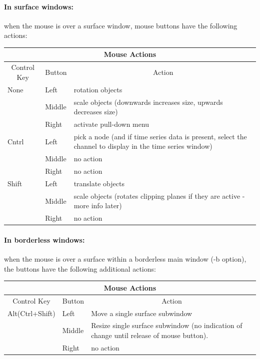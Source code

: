 \paragraph{In surface windows: } when the mouse is over a surface window,
mouse buttons have the following actions:
\begin{center}
  \begin{tabular}{|l|l|p{3in}|} \hline
    \multicolumn{3}{|c|}{Mouse Actions}\\ \hline
    \multicolumn{1}{|c|}{Control Key} & 
    \multicolumn{1}{|c|}{Button} & 
    \multicolumn{1}{|c|}{Action}\\ \hline
    None & Left & rotation objects \\
    & Middle & scale objects (downwards increases size, upwards decreases
    size) \\ 
    & Right & activate pull-down menu \\ \hline
    Cntrl & Left & pick a node (and if time series data is present, select the
    channel to display in the time series window) \\
    & Middle &  no action \\
    & Right &  no action \\ \hline
    Shift & Left & translate objects \\
    & Middle & scale objects (rotates clipping planes if they are active
    - more info later) \\ 
    & Right & no action \\ \hline
\end{tabular}
\end{center}

\paragraph{In borderless windows: } when the mouse is over a 
surface within a borderless main window (-b option), the buttons have the
following additional actions: 
\begin{center}
  \begin{tabular}{|l|l|p{3in}|} \hline
    \multicolumn{3}{|c|}{Mouse Actions}\\ \hline
    \multicolumn{1}{|c|}{Control Key} & 
    \multicolumn{1}{|c|}{Button} & 
    \multicolumn{1}{|c|}{Action}\\ \hline
    Alt(Ctrl+Shift)   & Left & Move a single surface subwindow \\ 
      & Middle & Resize single surface subwindow (no indication of change
    until release of mouse button).\\ 
      & Right & no action \\ \hline
  \end{tabular}
\end{center}

